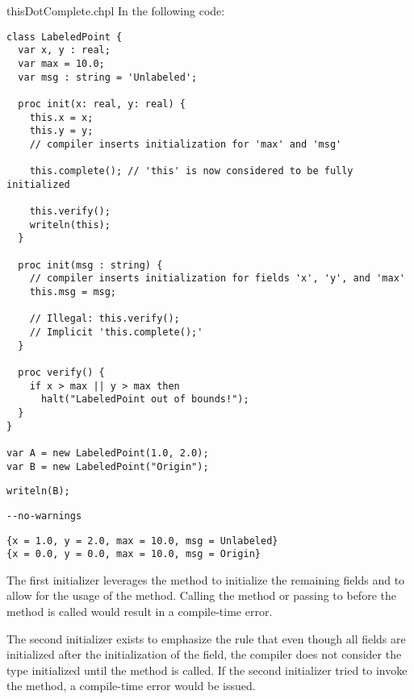 \begin{chapelexample}{thisDotComplete.chpl}
In the following code:
\begin{chapel}
\begin{verbatim}
class LabeledPoint {
  var x, y : real;
  var max = 10.0;
  var msg : string = 'Unlabeled';

  proc init(x: real, y: real) {
    this.x = x;
    this.y = y;
    // compiler inserts initialization for 'max' and 'msg'

    this.complete(); // 'this' is now considered to be fully initialized

    this.verify();
    writeln(this);
  }

  proc init(msg : string) {
    // compiler inserts initialization for fields 'x', 'y', and 'max'
    this.msg = msg;

    // Illegal: this.verify();
    // Implicit 'this.complete();'
  }

  proc verify() {
    if x > max || y > max then
      halt("LabeledPoint out of bounds!");
  }
}

var A = new LabeledPoint(1.0, 2.0);
var B = new LabeledPoint("Origin");
\end{verbatim}
\end{chapel}
\begin{chapelpost}
\begin{verbatim}
writeln(B);
\end{verbatim}
\end{chapelpost}
\begin{chapelcompopts}
\begin{verbatim}
--no-warnings
\end{verbatim}
\end{chapelcompopts}
\begin{chapeloutput}
\begin{verbatim}
{x = 1.0, y = 2.0, max = 10.0, msg = Unlabeled}
{x = 0.0, y = 0.0, max = 10.0, msg = Origin}
\end{verbatim}
\end{chapeloutput}

The first initializer leverages the  method to initialize the
remaining fields and to allow for the usage of the  method.
Calling the  method or passing  to 
before the  method is called would result in a compile-time
error.

The second initializer exists to emphasize the rule that even though all
fields are initialized after the initialization of the  field, the
compiler does not consider the type initialized until the 
method is called. If the second initializer tried to invoke the 
method, a compile-time error would be issued.
\end{chapelexample}

